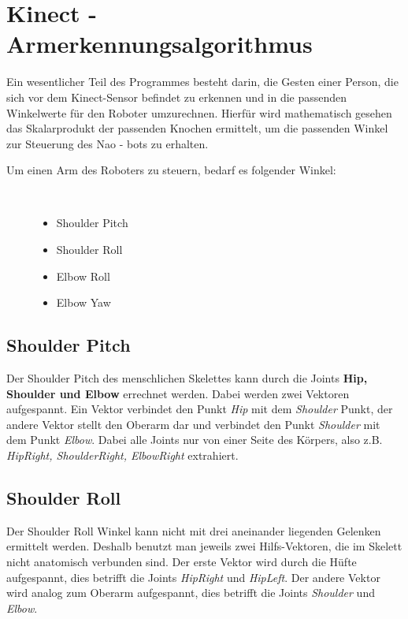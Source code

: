 \section{Kinect - Armerkennungsalgorithmus}\label{algo_angle}
Ein wesentlicher Teil des Programmes besteht darin, die Gesten einer Person, die sich vor dem Kinect-Sensor befindet zu erkennen und in die passenden Winkelwerte für den Roboter umzurechnen.
Hierfür wird mathematisch gesehen das Skalarprodukt der passenden Knochen ermittelt, um die passenden Winkel zur Steuerung des Nao - bots zu erhalten.

\begin{description}
	\item[Um einen Arm des Roboters zu steuern, bedarf es folgender Winkel:]~\par
	\begin{itemize}
		\item Shoulder Pitch
		\item Shoulder Roll
		\item Elbow Roll
		\item Elbow Yaw
	\end{itemize}
\end{description}

\subsection{Shoulder Pitch}
Der Shoulder Pitch des menschlichen Skelettes kann durch die Joints \textbf{Hip, Shoulder und Elbow} errechnet werden. Dabei werden zwei Vektoren aufgespannt. Ein Vektor verbindet den Punkt \textit{Hip} mit dem \textit{Shoulder} Punkt, der andere Vektor stellt den Oberarm dar und verbindet den Punkt \textit{Shoulder} mit dem Punkt \textit{Elbow}. Dabei alle Joints nur von einer Seite des Körpers, also z.B. \textit{HipRight, ShoulderRight, ElbowRight} extrahiert.


\subsection{Shoulder Roll}
Der Shoulder Roll Winkel kann nicht mit drei aneinander liegenden Gelenken ermittelt werden. Deshalb benutzt man jeweils zwei Hilfs-Vektoren, die im Skelett nicht anatomisch verbunden sind. Der erste Vektor wird durch die Hüfte aufgespannt, dies betrifft die Joints \textit{HipRight} und \textit{HipLeft}. Der andere Vektor wird analog zum Oberarm aufgespannt, dies betrifft die Joints \textit{Shoulder} und \textit{Elbow}.

